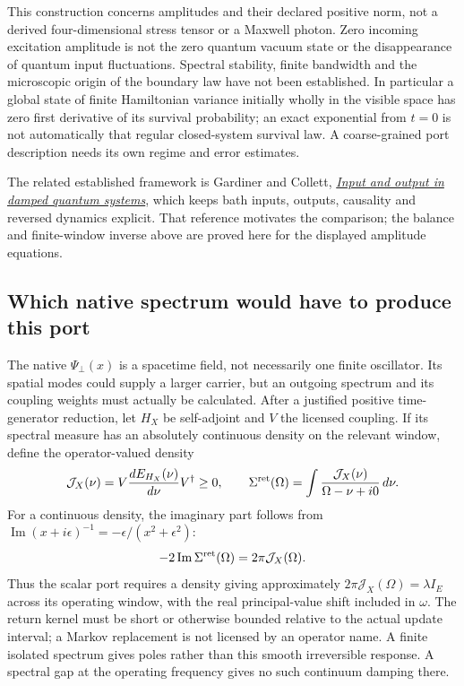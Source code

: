 \documentclass[11pt,a4paper]{article}
\begin{document}
This construction concerns amplitudes and their declared positive
norm, not a derived four-dimensional stress tensor or a Maxwell
photon. Zero incoming excitation amplitude is not the zero quantum
vacuum state or the disappearance of quantum input fluctuations.
Spectral stability, finite bandwidth and the microscopic origin
of the boundary law have not been established. In particular a
global state of finite Hamiltonian variance initially wholly in
the visible space has zero first derivative of its survival
probability; an exact exponential from $t=0$ is not automatically
that regular closed-system survival law. A coarse-grained port
description needs its own regime and error estimates.

The related established framework is Gardiner and Collett,
\href{https://journals.aps.org/pra/abstract/10.1103/PhysRevA.31.3761}{
\emph{Input and output in damped quantum systems}}, which keeps
bath inputs, outputs, causality and reversed dynamics explicit.
That reference motivates the comparison; the balance and finite-window
inverse above are proved here for the displayed amplitude equations.

\subsection{Which native spectrum would have to produce this port}

The native $\Psi_\perp(x)$ is a spacetime field, not necessarily
one finite oscillator. Its spatial modes could supply a larger
carrier, but an outgoing spectrum and its coupling weights must
actually be calculated. After a justified positive time-generator
reduction, let $H_X$ be self-adjoint and $V$ the licensed coupling.
If its spectral measure has an absolutely continuous density on
the relevant window, define the operator-valued density
\[
 \mathcal J_X(\nu)
 =V\frac{dE_{H_X}(\nu)}{d\nu}V^\dagger\ge0,
 \qquad
 \Sigma^{\rm ret}(\Omega)
 =\int\frac{\mathcal J_X(\nu)}{\Omega-\nu+i0}\,d\nu.
\]
For a continuous density, the imaginary part follows from
$\operatorname{Im}(x+i\epsilon)^{-1}
=-\epsilon/(x^2+\epsilon^2)$:
\[
 -2\operatorname{Im}\Sigma^{\rm ret}(\Omega)
 =2\pi\mathcal J_X(\Omega).
\]
Thus the scalar port requires a density giving approximately
$2\pi\mathcal J_X(\Omega)=\lambda I_E$ across its operating
window, with the real principal-value shift included in $\omega$.
The return kernel must be short or otherwise bounded relative to
the actual update interval; a Markov replacement is not licensed
by an operator name. A finite isolated spectrum gives poles rather
than this smooth irreversible response. A spectral gap at the
operating frequency gives no such continuum damping there.
\end{document}

